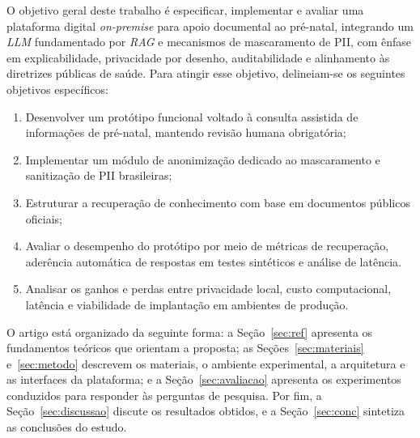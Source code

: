 O objetivo geral deste trabalho é especificar, implementar e avaliar uma plataforma digital \textit{on-premise} para apoio documental ao pré-natal, integrando um \textit{LLM} fundamentado por \textit{RAG} e mecanismos de mascaramento de PII, com ênfase em explicabilidade, privacidade por desenho, auditabilidade e alinhamento às diretrizes públicas de saúde. Para atingir esse objetivo, delineiam-se os seguintes objetivos específicos:

\begin{enumerate}
  \item Desenvolver um protótipo funcional voltado à consulta assistida de informações de pré-natal, mantendo revisão humana obrigatória;
  \item Implementar um módulo de anonimização dedicado ao mascaramento e sanitização de PII brasileiras;
  \item Estruturar a recuperação de conhecimento com base em documentos públicos oficiais;
  \item Avaliar o desempenho do protótipo por meio de métricas de recuperação, aderência automática de respostas em testes sintéticos e análise de latência.
  \item Analisar os ganhos e perdas entre privacidade local, custo computacional, latência e viabilidade de implantação em ambientes de produção.
\end{enumerate}

O artigo está organizado da seguinte forma: a Seção~\ref{sec:ref} apresenta os fundamentos teóricos que orientam a proposta; as Seções~\ref{sec:materiais} e~\ref{sec:metodo} descrevem os materiais, o ambiente experimental, a arquitetura e as interfaces da plataforma; e a Seção~\ref{sec:avaliacao} apresenta os experimentos conduzidos para responder às perguntas de pesquisa. Por fim, a Seção~\ref{sec:discussao} discute os resultados obtidos, e a Seção~\ref{sec:conc} sintetiza as conclusões do estudo.




